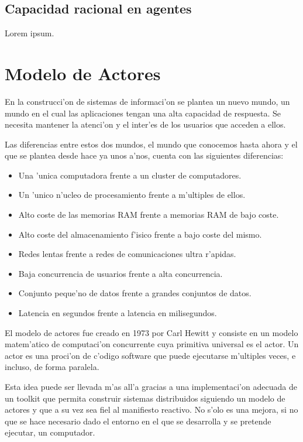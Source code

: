 \documentclass[12pt]{article}
\begin{document}
\subsection{Capacidad racional en agentes}
\label{sub:capacidad racional en agentes}
Lorem ipsum.
\section{Modelo de Actores}
\label{sec:modelos de actores}
En la construcci'on de sistemas de informaci'on se plantea un nuevo mundo, un mundo en el cual
las aplicaciones tengan una alta capacidad de respuesta. Se necesita mantener la atenci'on y el
inter'es de los usuarios que acceden a ellos.

Las diferencias entre estos dos mundos, el mundo que conocemos hasta ahora y el que se plantea
desde hace ya unos a'nos, cuenta con las siguientes diferencias:

\begin{itemize}
	\item Una 'unica computadora frente a un cluster de computadores.
	\item Un 'unico n'ucleo de procesamiento frente a m'ultiples de ellos.
	\item Alto coste de las memorias RAM frente a memorias RAM de bajo coste.
	\item Alto coste del almacenamiento f'isico frente a bajo coste del mismo.
    \item Redes lentas frente a redes de comunicaciones ultra r'apidas.
    \item Baja concurrencia de usuarios frente a alta concurrencia.
    \item Conjunto peque'no de datos frente a grandes conjuntos de datos.
    \item Latencia en segundos frente a latencia en milisegundos.
\end{itemize}

El modelo de actores fue creado en 1973 por Carl Hewitt y consiste en un modelo
matem'atico de computaci'on concurrente cuya primitiva universal es el actor. Un actor es
una proci'on de c'odigo software que puede ejecutarse m'ultiples veces, e incluso,
de forma paralela.

Esta idea puede ser llevada m'as all'a gracias a una implementaci'on adecuada de un toolkit
que permita construir sistemas distribuidos siguiendo un modelo de actores y que a su vez
sea fiel al manifiesto reactivo. No s'olo es una mejora, si no que se hace necesario dado
el entorno en el que se desarrolla y se pretende ejecutar, un computador.
\end{document}
